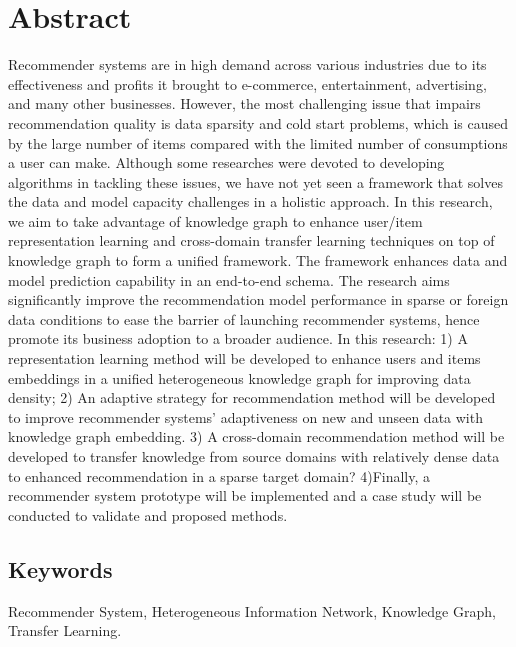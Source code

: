 \section*{Abstract}
Recommender systems are in high demand across various industries due to its effectiveness and profits it brought to e-commerce, entertainment, advertising, and many other businesses. However, the most challenging issue that impairs recommendation quality is data sparsity and cold start problems, which is caused by the large number of items compared with the limited number of  consumptions a user can make. Although some researches were devoted to developing algorithms in tackling these issues, we have not yet seen a framework that solves the data and model capacity challenges in a holistic approach. In this research, we aim to take advantage of knowledge graph to enhance user/item representation learning and cross-domain transfer learning techniques on top of knowledge graph to form a unified framework. The framework enhances data and model prediction capability in an end-to-end schema. The research aims significantly improve the recommendation model performance in sparse or foreign data conditions to ease the barrier of launching recommender systems, hence promote its business adoption to a broader audience. In this research: 1) A representation learning method will be developed to enhance users and items embeddings in a unified heterogeneous knowledge graph for improving data density; 2) An adaptive strategy for recommendation method will be developed to improve recommender systems’ adaptiveness on new and unseen data with knowledge graph embedding. 3) A cross-domain recommendation method will be developed to transfer knowledge from source domains with relatively dense data to  enhanced recommendation in a sparse target domain? 4)Finally, a recommender system prototype will be implemented and a case study will be conducted to validate and proposed methods.  

\subsection*{Keywords} 
Recommender System, Heterogeneous Information Network, Knowledge Graph, Transfer Learning.